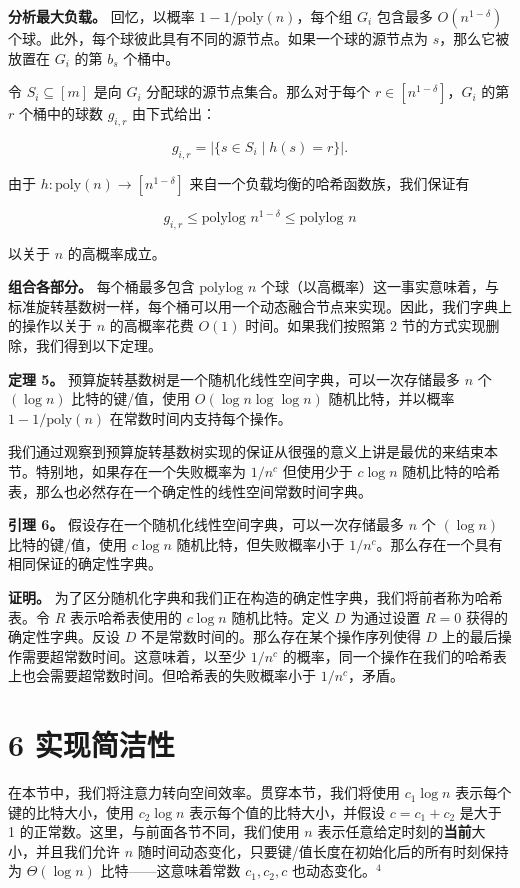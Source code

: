 \documentclass[12pt,a4paper]{ctexart}
\theoremstyle{remark}
\begin{document}
\textbf{分析最大负载。} 回忆，以概率 $1-1/\text{poly}(n)$，每个组 $G_i$ 包含最多 $O(n^{1-\delta})$ 个球。此外，每个球彼此具有不同的源节点。如果一个球的源节点为 $s$，那么它被放置在 $G_i$ 的第 $b_s$ 个桶中。

令 $S_i\subseteq[m]$ 是向 $G_i$ 分配球的源节点集合。那么对于每个 $r\in[n^{1-\delta}]$，$G_i$ 的第 $r$ 个桶中的球数 $g_{i,r}$ 由下式给出：

$$g_{i,r}=|\{s\in S_i\mid h(s)=r\}|.$$

由于 $h:\text{poly}(n)\to[n^{1-\delta}]$ 来自一个负载均衡的哈希函数族，我们保证有

$$g_{i,r}\leq\text{polylog } n^{1-\delta}\leq\text{polylog } n$$

以关于 $n$ 的高概率成立。

\textbf{组合各部分。} 每个桶最多包含 $\text{polylog } n$ 个球（以高概率）这一事实意味着，与标准旋转基数树一样，每个桶可以用一个动态融合节点来实现。因此，我们字典上的操作以关于 $n$ 的高概率花费 $O(1)$ 时间。如果我们按照第 2 节的方式实现删除，我们得到以下定理。

\textbf{定理 5。} 预算旋转基数树是一个随机化线性空间字典，可以一次存储最多 $n$ 个 $(\log n)$ 比特的键/值，使用 $O(\log n\log\log n)$ 随机比特，并以概率 $1-1/\text{poly}(n)$ 在常数时间内支持每个操作。

我们通过观察到预算旋转基数树实现的保证从很强的意义上讲是最优的来结束本节。特别地，如果存在一个失败概率为 $1/n^c$ 但使用少于 $c\log n$ 随机比特的哈希表，那么也必然存在一个确定性的线性空间常数时间字典。

\textbf{引理 6。} 假设存在一个随机化线性空间字典，可以一次存储最多 $n$ 个 $(\log n)$ 比特的键/值，使用 $c\log n$ 随机比特，但失败概率小于 $1/n^c$。那么存在一个具有相同保证的确定性字典。

\textbf{证明。} 为了区分随机化字典和我们正在构造的确定性字典，我们将前者称为哈希表。令 $R$ 表示哈希表使用的 $c\log n$ 随机比特。定义 $D$ 为通过设置 $R=0$ 获得的确定性字典。反设 $D$ 不是常数时间的。那么存在某个操作序列使得 $D$ 上的最后操作需要超常数时间。这意味着，以至少 $1/n^c$ 的概率，同一个操作在我们的哈希表上也会需要超常数时间。但哈希表的失败概率小于 $1/n^c$，矛盾。

\medskip
\section{6 实现简洁性}
在本节中，我们将注意力转向空间效率。贯穿本节，我们将使用 $c_1\log n$ 表示每个键的比特大小，使用 $c_2\log n$ 表示每个值的比特大小，并假设 $c=c_1+c_2$ 是大于 1 的正常数。这里，与前面各节不同，我们使用 $n$ 表示任意给定时刻的\textbf{当前}大小，并且我们允许 $n$ 随时间动态变化，只要键/值长度在初始化后的所有时刻保持为 $\Theta(\log n)$ 比特——这意味着常数 $c_1,c_2,c$ 也动态变化。$^4$
\end{document}
